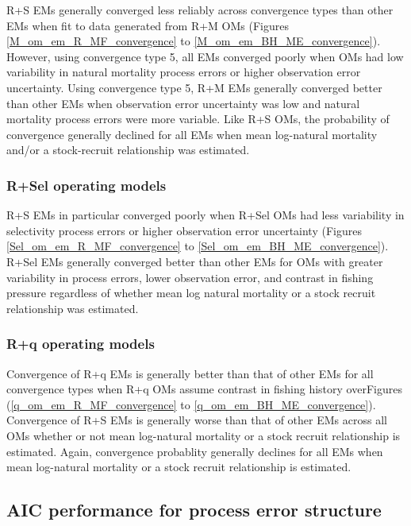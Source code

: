 \documentclass[
  12pt,
]{article}
\begin{document}
R+S EMs generally converged less reliably across convergence types than
other EMs when fit to data generated from R+M OMs (Figures
\ref{M_om_em_R_MF_convergence} to \ref{M_om_em_BH_ME_convergence}).
However, using convergence type 5, all EMs converged poorly when OMs had
low variability in natural mortality process errors or higher
observation error uncertainty. Using convergence type 5, R+M EMs
generally converged better than other EMs when observation error
uncertainty was low and natural mortality process errors were more
variable. Like R+S OMs, the probability of convergence generally
declined for all EMs when mean log-natural mortality and/or a
stock-recruit relationship was estimated.

\hypertarget{rsel-operating-models}{%
\subsubsection*{R+Sel operating models}\label{rsel-operating-models}}

R+S EMs in particular converged poorly when R+Sel OMs had less
variability in selectivity process errors or higher observation error
uncertainty (Figures \ref{Sel_om_em_R_MF_convergence} to
\ref{Sel_om_em_BH_ME_convergence}). R+Sel EMs generally converged better
than other EMs for OMs with greater variability in process errors, lower
observation error, and contrast in fishing pressure regardless of
whether mean log natural mortality or a stock recruit relationship was
estimated.

\hypertarget{rq-operating-models}{%
\subsubsection*{R+q operating models}\label{rq-operating-models}}

Convergence of R+q EMs is generally better than that of other EMs for
all convergence types when R+q OMs assume contrast in fishing history
overFigures (\ref{q_om_em_R_MF_convergence} to
\ref{q_om_em_BH_ME_convergence}). Convergence of R+S EMs is generally
worse than that of other EMs across all OMs whether or not mean
log-natural mortality or a stock recruit relationship is estimated.
Again, convergence probablity generally declines for all EMs when mean
log-natural mortality or a stock recruit relationship is estimated.

\hypertarget{aic-performance-for-process-error-structure}{%
\subsection*{AIC performance for process error
structure}\label{aic-performance-for-process-error-structure}}
\end{document}
